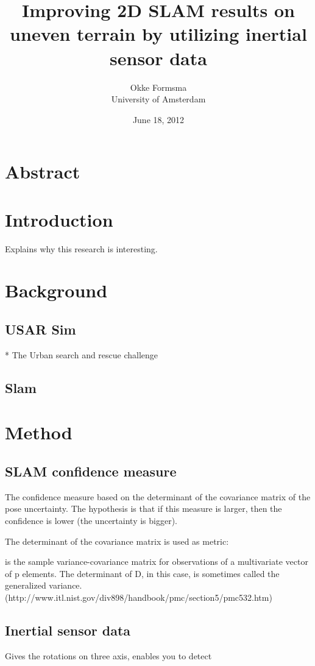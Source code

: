 \documentclass[a4paper, 10pt]{report}
\title{Improving 2D SLAM results on uneven terrain by utilizing inertial sensor data}
\date{June 18, 2012}
\author{Okke Formsma\\ University of Amsterdam}
\begin{document}
\maketitle


\chapter*{Abstract}


%

\tableofcontents
{}

\chapter{Introduction}
\label{chapter:introduction}
Explains why this research is interesting.



\chapter{Background}
\section{USAR Sim}
* The Urban search and rescue challenge

\section{Slam}


\chapter{Method}
\section{SLAM confidence measure}
The confidence measure based on the determinant of the covariance matrix of the pose uncertainty. The hypothesis is that if this measure is larger, then the confidence is lower (the uncertainty is bigger).

The determinant of the covariance matrix is used as metric:

is the sample variance-covariance matrix for observations of a multivariate vector of p elements. The determinant of D, in this case, is sometimes called the generalized variance. (http://www.itl.nist.gov/div898/handbook/pmc/section5/pmc532.htm)

\section{Inertial sensor data}
Gives the rotations on three axis, enables you to detect 
\end{document}
